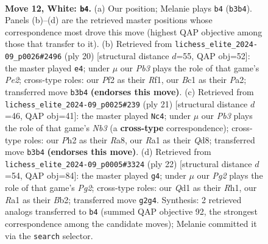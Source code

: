\documentclass[11pt]{article}
\begin{document}
\clearpage

\begin{figure}[p]\centering
\begin{subfigure}{0.46\textwidth}\centering
\resizebox{\linewidth}{!}{%
\newchessgame
\chessboard[
  setfen={1nbq1rk1/rp2bppp/p2p1n2/4p3/P3P3/1PNB1N2/2P2PPP/R1BQ1RK1 w - - 3 12},
  showmover=false,
  pgfstyle=straightmove, color=movearrow, markmove={b3-b4}
]}
\caption{}
\end{subfigure}\hfill
\begin{subfigure}{0.46\textwidth}\centering
\resizebox{\linewidth}{!}{%
\newchessgame
\chessboard[
  setfen={r2q1rk1/pp3pb1/2n1bnpp/2ppp3/8/2NP1NP1/PPP1PPBP/R1BQ1RK1 w - - 0 11},
  showmover=false,
  pgfstyle=straightmove, color=movearrow, markmove={e2-e4}
]}
\caption{}
\end{subfigure}
\\[4pt]
\begin{subfigure}{0.46\textwidth}\centering
\resizebox{\linewidth}{!}{%
\newchessgame
\chessboard[
  setfen={r1bq1rk1/pp2bppp/1n2p3/3p3n/3P4/P1N1BNP1/1P2PPBP/R2Q1RK1 b - - 2 11},
  showmover=false,
  pgfstyle=straightmove, color=movearrow, markmove={b6-c4}
]}
\caption{}
\end{subfigure}\hfill
\begin{subfigure}{0.46\textwidth}\centering
\resizebox{\linewidth}{!}{%
\newchessgame
\chessboard[
  setfen={rn1q1rk1/1b2bppp/p2ppn2/8/Pp1NP3/1P1B4/1BPNQPPP/2KR3R w - - 2 12},
  showmover=false,
  pgfstyle=straightmove, color=movearrow, markmove={g2-g4}
]}
\caption{}
\end{subfigure}
\caption{\textbf{Move 12, White: \texttt{b4}.} (a) Our position; Melanie plays \texttt{b4} (\texttt{b3b4}). Panels (b)--(d) are the retrieved master positions whose correspondence most drove this move (highest QAP objective among those that transfer to it). (b) Retrieved from \texttt{lichess\_elite\_2024-09\_p0026\#2496} (ply 20) [structural distance $d$=55, QAP obj=52]: the master played \texttt{e4}; under $\mu$ our \emph{Pb3} plays the role of that game's \emph{Pe2}; cross-type roles: our \emph{P}f2 as their \emph{R}f1, our \emph{B}c1 as their \emph{P}a2; transferred move \texttt{b3b4} \textbf{(endorses this move)}. (c) Retrieved from \texttt{lichess\_elite\_2024-09\_p0025\#239} (ply 21) [structural distance $d$=46, QAP obj=41]: the master played \texttt{Nc4}; under $\mu$ our \emph{Pb3} plays the role of that game's \emph{Nb3} (a \textbf{cross-type} correspondence); cross-type roles: our \emph{P}h2 as their \emph{R}a8, our \emph{R}a1 as their \emph{Q}d8; transferred move \texttt{b3b4} \textbf{(endorses this move)}. (d) Retrieved from \texttt{lichess\_elite\_2024-09\_p0005\#3324} (ply 22) [structural distance $d$=54, QAP obj=84]: the master played \texttt{g4}; under $\mu$ our \emph{Pg2} plays the role of that game's \emph{Pg2}; cross-type roles: our \emph{Q}d1 as their \emph{R}h1, our \emph{R}a1 as their \emph{B}b2; transferred move \texttt{g2g4}. Synthesis: 2 retrieved analogs transferred to \texttt{b4} (summed QAP objective 92, the strongest correspondence among the candidate moves); Melanie committed it via the \texttt{search} selector.}
\label{fig:thought-m22}
\end{figure}
\end{document}
